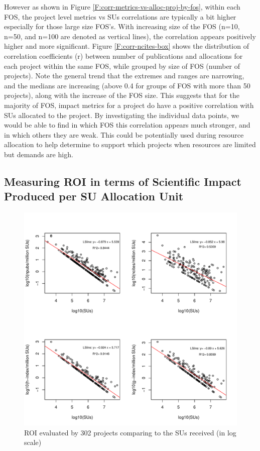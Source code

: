 \documentclass{sig-alternate}
\begin{document}
However as shown in Figure \ref{F:corr-metrics-vs-alloc-proj-by-fos}, within each FOS, the project level metrics vs SUs correlations are typically a bit higher especially for those large size FOS's. With increasing size of the FOS (n=10, n=50, and n=100 are denoted as vertical lines), the correlation appears positively higher and more significant. Figure \ref{F:corr-ncites-box} shows the distribution of correlation coefficients (r) between number of publications and allocations for each project within the same FOS, while grouped by size of FOS (number of projects). Note the general trend that the extremes and ranges are narrowing, and the medians are increasing (above 0.4 for groups of FOS with more than 50 projects), along with the increase of the FOS size. This suggests that for the majority of FOS, impact metrics for a project do have a positive correlation with SUs allocated to the project. By investigating the individual data points, we would be able to find in which FOS this correlation appears much stronger, and in which others they are weak. This could be potentially used during resource allocation to help determine to support which projects when resources are limited but demands are high.

\subsection{Measuring ROI in terms of Scientific Impact Produced per SU Allocation Unit} 

\begin{figure}[!htb] 
  \centering 
    \includegraphics[width=1.0\columnwidth]{images/09_roi_projs.pdf} 
  \caption{ROI evaluated by 302 projects comparing to the SUs received (in log scale)}\label{F:projs-roi} 
\end{figure} 
\end{document}
